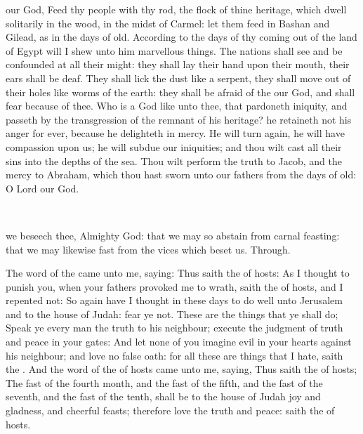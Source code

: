  our God, Feed thy people with thy rod, the flock of thine heritage, which dwell solitarily in the wood, in the midst of Carmel: let them feed in Bashan and Gilead, as in the days of old. According to the days of thy coming out of the land of Egypt will I shew unto him marvellous things. The nations shall see and be confounded at all their might: they shall lay their hand upon their mouth, their ears shall be deaf. They shall lick the dust like a serpent, they shall move out of their holes like worms of the earth: they shall be afraid of the  our God, and shall fear because of thee. Who is a God like unto thee, that pardoneth iniquity, and passeth by the transgression of the remnant of his heritage? he retaineth not his anger for ever, because he delighteth in mercy. He will turn again, he will have compassion upon us; he will subdue our iniquities; and thou wilt cast all their sins into the depths of the sea. Thou wilt perform the truth to Jacob, and the mercy to Abraham, which thou hast sworn unto our fathers from the days of old: O Lord our God.

\\


\collect
{} we beseech thee, Almighty God: that we may so abstain from carnal feasting: that we may likewise fast from the vices which beset us. Through.

 The word of the  came unto me, saying: Thus saith the  of hosts: As I thought to punish you, when your fathers provoked me to wrath, saith the  of hosts, and I repented not: So again have I thought in these days to do well unto Jerusalem and to the house of Judah: fear ye not. These are the things that ye shall do; Speak ye every man the truth to his neighbour; execute the judgment of truth and peace in your gates: And let none of you imagine evil in your hearts against his neighbour; and love no false oath: for all these are things that I hate, saith the . And the word of the  of hosts came unto me, saying, Thus saith the  of hosts; The fast of the fourth month, and the fast of the fifth, and the fast of the seventh, and the fast of the tenth, shall be to the house of Judah joy and gladness, and cheerful feasts; therefore love the truth and peace: saith the  of hosts.


